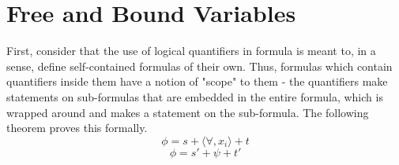 \documentclass{article}
\begin{document}
\section{Free and Bound Variables}
First, consider that the use of logical quantifiers in formula is meant to, in a sense, define self-contained formulas of their own. Thus, formulas which contain quantifiers inside them have a notion of "scope" to them - the quantifiers make statements on sub-formulas that are embedded in the entire formula, which is wrapped around and makes a statement on the sub-formula. The following theorem proves this formally.
    $$ \phi = s + \langle \forall, x_i \rangle + t $$
    $$ \phi = s' + \psi + t' $$
\end{document}
